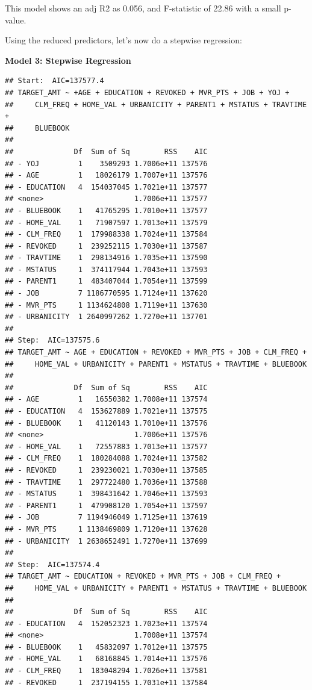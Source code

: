 \documentclass[]{article}
\begin{document}
This model shows an adj R2 as 0.056, and F-statistic of 22.86 with a
small p-value.

Using the reduced predictors, let's now do a stepwise regression:

\textbf{Model 3: Stepwise Regression }

\begin{verbatim}
## Start:  AIC=137577.4
## TARGET_AMT ~ +AGE + EDUCATION + REVOKED + MVR_PTS + JOB + YOJ + 
##     CLM_FREQ + HOME_VAL + URBANICITY + PARENT1 + MSTATUS + TRAVTIME + 
##     BLUEBOOK
## 
##              Df  Sum of Sq        RSS    AIC
## - YOJ         1    3509293 1.7006e+11 137576
## - AGE         1   18026179 1.7007e+11 137576
## - EDUCATION   4  154037045 1.7021e+11 137577
## <none>                     1.7006e+11 137577
## - BLUEBOOK    1   41765295 1.7010e+11 137577
## - HOME_VAL    1   71907597 1.7013e+11 137579
## - CLM_FREQ    1  179988338 1.7024e+11 137584
## - REVOKED     1  239252115 1.7030e+11 137587
## - TRAVTIME    1  298134916 1.7035e+11 137590
## - MSTATUS     1  374117944 1.7043e+11 137593
## - PARENT1     1  483407044 1.7054e+11 137599
## - JOB         7 1186770595 1.7124e+11 137620
## - MVR_PTS     1 1134624808 1.7119e+11 137630
## - URBANICITY  1 2640997262 1.7270e+11 137701
## 
## Step:  AIC=137575.6
## TARGET_AMT ~ AGE + EDUCATION + REVOKED + MVR_PTS + JOB + CLM_FREQ + 
##     HOME_VAL + URBANICITY + PARENT1 + MSTATUS + TRAVTIME + BLUEBOOK
## 
##              Df  Sum of Sq        RSS    AIC
## - AGE         1   16550382 1.7008e+11 137574
## - EDUCATION   4  153627889 1.7021e+11 137575
## - BLUEBOOK    1   41120143 1.7010e+11 137576
## <none>                     1.7006e+11 137576
## - HOME_VAL    1   72557883 1.7013e+11 137577
## - CLM_FREQ    1  180284088 1.7024e+11 137582
## - REVOKED     1  239230021 1.7030e+11 137585
## - TRAVTIME    1  297722480 1.7036e+11 137588
## - MSTATUS     1  398431642 1.7046e+11 137593
## - PARENT1     1  479908120 1.7054e+11 137597
## - JOB         7 1194946049 1.7125e+11 137619
## - MVR_PTS     1 1138469809 1.7120e+11 137628
## - URBANICITY  1 2638652491 1.7270e+11 137699
## 
## Step:  AIC=137574.4
## TARGET_AMT ~ EDUCATION + REVOKED + MVR_PTS + JOB + CLM_FREQ + 
##     HOME_VAL + URBANICITY + PARENT1 + MSTATUS + TRAVTIME + BLUEBOOK
## 
##              Df  Sum of Sq        RSS    AIC
## - EDUCATION   4  152052323 1.7023e+11 137574
## <none>                     1.7008e+11 137574
## - BLUEBOOK    1   45832097 1.7012e+11 137575
## - HOME_VAL    1   68168845 1.7014e+11 137576
## - CLM_FREQ    1  183048294 1.7026e+11 137581
## - REVOKED     1  237194155 1.7031e+11 137584

\end{verbatim}
\end{document}
